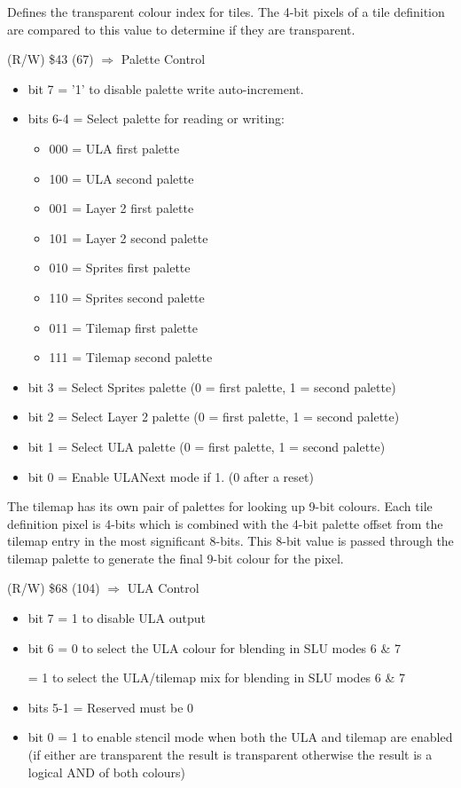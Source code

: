 Defines the transparent colour index for tiles.  The 4-bit pixels of a tile definition are compared to this value to determine if they are transparent.

(R/W) \$43 (67) $\Rightarrow$ Palette Control
\begin{itemize}
\item bit 7 = '1' to disable palette write auto-increment.
\item bits 6-4 = Select palette for reading or writing:
  \begin{itemize}
  \item 000 = ULA first palette
  \item 100 = ULA second palette
  \item 001 = Layer 2 first palette
  \item 101 = Layer 2 second palette
  \item 010 = Sprites first palette 
  \item 110 = Sprites second palette
  \item 011 = Tilemap first palette
  \item 111 = Tilemap second palette
  \end{itemize}
\item bit 3 = Select Sprites palette (0 = first palette, 1 = second palette)
\item bit 2 = Select Layer 2 palette (0 = first palette, 1 = second palette)
\item bit 1 = Select ULA palette (0 = first palette, 1 = second palette)
\item bit 0 = Enable ULANext mode if 1. (0 after a reset)
\end{itemize}

The tilemap has its own pair of palettes for looking up 9-bit colours.  Each 
tile definition pixel is 4-bits which is combined with the 4-bit palette offset
from the tilemap entry in the most significant 8-bits.  This 8-bit value is 
passed through the tilemap palette to generate the final 9-bit colour for the 
pixel.

(R/W) \$68 (104) $\Rightarrow$ ULA Control
\begin{itemize}
\item bit 7 = 1 to disable ULA output
\item bit 6 = 0 to select the ULA colour for blending in SLU modes 6 \& 7
  
  = 1 to select the ULA/tilemap mix for blending in SLU modes 6 \& 7
\item bits 5-1 = Reserved must be 0
\item bit 0 = 1 to enable stencil mode when both the ULA and tilemap
  are enabled (if either are transparent the result is transparent
  otherwise the result is a logical AND of both colours)
\end{itemize}

